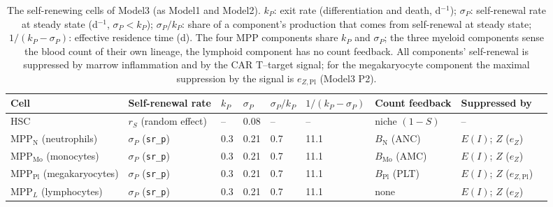 \begin{table}[!htbp]
\centering
\footnotesize
\setlength{\tabcolsep}{3.5pt}
\caption{The self-renewing cells of Model3 (as Model1 and Model2). $k_P$: exit rate (differentiation and death, d$^{-1}$); $\sigma_P$: self-renewal rate at steady state (d$^{-1}$, $\sigma_P<k_P$); $\sigma_P/k_P$: share of a component's production that comes from self-renewal at steady state; $1/(k_P-\sigma_P)$: effective residence time (d). The four MPP components share $k_P$ and $\sigma_P$; the three myeloid components sense the blood count of their own lineage, the lymphoid component has no count feedback. All components' self-renewal is suppressed by marrow inflammation and by the CAR T--target signal; for the megakaryocyte component the maximal suppression by the signal is $e_{Z,\mathrm{Pl}}$ (Model3 P2).}
\label{tab:selfrenewal}
\begin{tabular}{lllllll>{\raggedright\arraybackslash}p{2.0cm}>{\raggedright\arraybackslash}p{1.9cm}}
\toprule
Cell & Self-renewal rate & $k_P$ & $\sigma_P$ & $\sigma_P/k_P$ & $1/(k_P-\sigma_P)$ & Count feedback & Suppressed by \\
\midrule
HSC & $r_S$ (random effect) & -- & 0.08 & -- & -- & niche $(1-S)$ & -- \\
MPP$_{\mathrm{N}}$ (neutrophils) & $\sigma_P$ (\texttt{sr\_p}) & 0.3 & 0.21 & 0.7 & 11.1 & $B_{\mathrm{N}}$ (ANC) & $E(I)$; $Z$ ($e_Z$) \\
MPP$_{\mathrm{Mo}}$ (monocytes) & $\sigma_P$ (\texttt{sr\_p}) & 0.3 & 0.21 & 0.7 & 11.1 & $B_{\mathrm{Mo}}$ (AMC) & $E(I)$; $Z$ ($e_Z$) \\
MPP$_{\mathrm{Pl}}$ (megakaryocytes) & $\sigma_P$ (\texttt{sr\_p}) & 0.3 & 0.21 & 0.7 & 11.1 & $B_{\mathrm{Pl}}$ (PLT) & $E(I)$; $Z$ ($e_{Z,\mathrm{Pl}}$) \\
MPP$_{L}$ (lymphocytes) & $\sigma_P$ (\texttt{sr\_p}) & 0.3 & 0.21 & 0.7 & 11.1 & none & $E(I)$; $Z$ ($e_Z$) \\
\bottomrule
\end{tabular}
\end{table}
